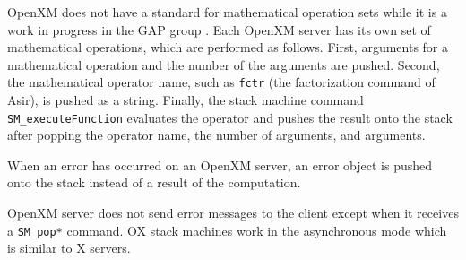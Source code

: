 OpenXM does not have a standard for mathematical operation sets
while it is a work in progress in the GAP group \cite{gap}.
Each OpenXM server has its own set of mathematical operations,
which are performed as follows.
First, arguments for a mathematical operation
and the number of the arguments are pushed.
Second, 
the mathematical operator name, 
such as {\tt fctr} (the factorization command of Asir),
is pushed as a string.
Finally, the stack machine command
{\tt SM\_executeFunction} evaluates the operator and
pushes the result onto the stack
after popping the operator name, the number of arguments,
and arguments.

When an error has occurred on an OpenXM server,
an error object is pushed onto the stack 
instead of a result of the computation.

OpenXM server does not send error messages to the client
except when it receives a {\tt SM\_pop*} command.
OX stack machines work in the asynchronous mode which is similar 
to X servers.





